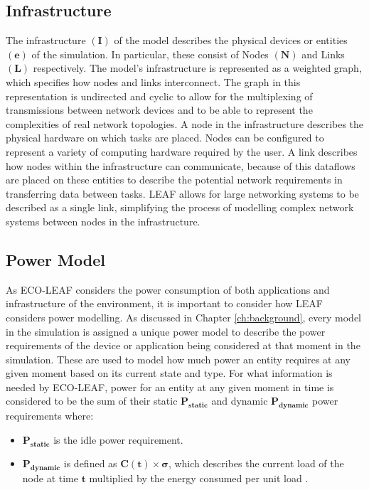 \documentclass{l4proj}
\begin{document}
\subsection{Infrastructure}\label{subsec:infrastructure}
The infrastructure $\mathbf{(I)}$ of the model describes the physical devices or entities $\mathbf{(e)}$ of the simulation. In particular, these consist of Nodes $\mathbf{(N)}$ and Links $\mathbf{(L)}$ respectively.
The model's infrastructure is represented as a weighted graph, which specifies how nodes and links interconnect.
The graph in this representation is undirected and cyclic to allow for the multiplexing of transmissions between network devices and to be able to represent the complexities of real network topologies.
A node in the infrastructure describes the physical hardware on which tasks are placed. Nodes can be configured to represent a variety of computing hardware required by the user.
A link describes how nodes within the infrastructure can communicate, because of this dataflows are placed on these entities to describe the potential network requirements in transferring data between tasks.
LEAF allows for large networking systems to be described as a single link, simplifying the process of modelling complex network systems between nodes in the infrastructure.

\subsection{Power Model}\label{subsec:power-model}
As ECO-LEAF considers the power consumption of both applications and infrastructure of the environment, it is important to consider how LEAF considers power modelling.
As discussed in Chapter \ref{ch:background}, every model in the simulation is assigned a unique power model to describe the power requirements of the device or application being considered at that moment in the simulation.
These are used to model how much power an entity requires at any given moment based on its current state and type.
For what information is needed by ECO-LEAF, power for an entity at any given moment in time is considered to be the sum of their static $\mathbf{P_{static}}$ and dynamic $\mathbf{P_{dynamic}}$ power requirements where:
\begin{itemize}
    \item $\mathbf{P_{static}}$ is the idle power requirement.\\
    \item $\mathbf{P_{dynamic}}$ is defined as $\mathbf{C(t) \times \sigma}$, which describes the current load of the node at time $\mathbf{t}$ multiplied by the energy consumed per unit load \citep{leaf2021}.
\end{itemize}
\end{document}
